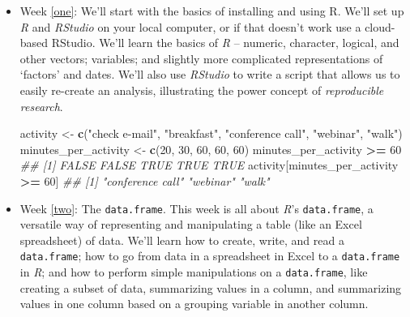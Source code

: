 \documentclass[]{book}
\newenvironment{Shaded}{\begin{snugshade}}{\end{snugshade}}
\newcommand{\CommentTok}[1]{\textcolor[rgb]{0.56,0.35,0.01}{\textit{#1}}}
\newcommand{\DecValTok}[1]{\textcolor[rgb]{0.00,0.00,0.81}{#1}}
\newcommand{\KeywordTok}[1]{\textcolor[rgb]{0.13,0.29,0.53}{\textbf{#1}}}
\newcommand{\NormalTok}[1]{#1}
\newcommand{\OperatorTok}[1]{\textcolor[rgb]{0.81,0.36,0.00}{\textbf{#1}}}
\newcommand{\StringTok}[1]{\textcolor[rgb]{0.31,0.60,0.02}{#1}}
\begin{document}
\begin{itemize}
\item
  Week \ref{one}: We'll start with the basics of installing and using R. We'll set up \emph{R} and \emph{RStudio} on your local computer, or if that doesn't work use a cloud-based RStudio. We'll learn the basics of \emph{R} -- numeric, character, logical, and other vectors; variables; and slightly more complicated representations of `factors' and dates. We'll also use \emph{RStudio} to write a script that allows us to easily re-create an analysis, illustrating the power concept of \emph{reproducible research}.

\begin{Shaded}
\begin{Highlighting}[]
\NormalTok{activity <-}\StringTok{ }\KeywordTok{c}\NormalTok{(}\StringTok{"check e-mail"}\NormalTok{, }\StringTok{"breakfast"}\NormalTok{, }\StringTok{"conference call"}\NormalTok{, }\StringTok{"webinar"}\NormalTok{, }\StringTok{"walk"}\NormalTok{)}
\NormalTok{minutes_per_activity <-}\StringTok{ }\KeywordTok{c}\NormalTok{(}\DecValTok{20}\NormalTok{, }\DecValTok{30}\NormalTok{, }\DecValTok{60}\NormalTok{, }\DecValTok{60}\NormalTok{, }\DecValTok{60}\NormalTok{)}
\NormalTok{minutes_per_activity }\OperatorTok{>=}\StringTok{ }\DecValTok{60}
\CommentTok{## [1] FALSE FALSE  TRUE  TRUE  TRUE}
\NormalTok{activity[minutes_per_activity }\OperatorTok{>=}\StringTok{ }\DecValTok{60}\NormalTok{]}
\CommentTok{## [1] "conference call" "webinar"         "walk"}
\end{Highlighting}
\end{Shaded}
\item
  Week \ref{two}: The \texttt{data.frame}. This week is all about \emph{R}'s \texttt{data.frame}, a versatile way of representing and manipulating a table (like an Excel spreadsheet) of data. We'll learn how to create, write, and read a \texttt{data.frame}; how to go from data in a spreadsheet in Excel to a \texttt{data.frame} in \emph{R}; and how to perform simple manipulations on a \texttt{data.frame}, like creating a subset of data, summarizing values in a column, and summarizing values in one column based on a grouping variable in another column.


\end{itemize}
\end{document}
